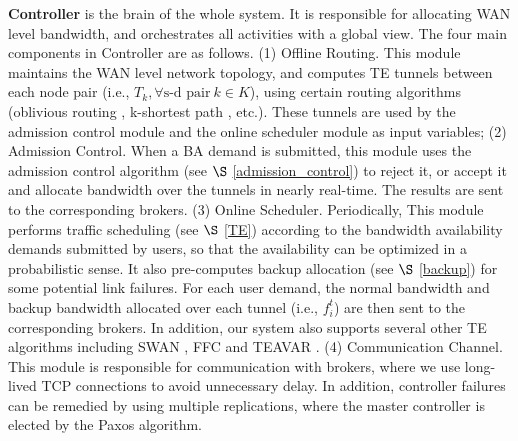 \documentclass[sigconf]{acmart}
\begin{document}



\textbf{Controller} is the brain of the whole system. It is responsible for allocating WAN level bandwidth, and orchestrates all activities with a global view. The four main components in Controller are as follows.
(1) Offline Routing.
This module maintains the WAN level network topology, and computes TE tunnels between each node pair
 (i.e., $T_k,\forall \text{s-d pair} \ k \in K$), using certain routing algorithms (oblivious routing \cite{SMORE}, k-shortest path \cite{swan}, etc.). 
These tunnels are used by the admission control module and the online scheduler module as input variables;
(2) Admission Control.
When a BA demand is submitted, this module uses the admission control algorithm (see $\S$ \ref{admission_control}) to reject it, or accept it and allocate bandwidth over the tunnels in nearly real-time.
The results are sent to the corresponding brokers.
(3) Online Scheduler. 
Periodically, This module performs traffic scheduling (see $\S$ \ref{TE}) according to the bandwidth availability demands submitted by users, so that the availability can be optimized in a probabilistic sense. 
It also pre-computes backup allocation (see $\S$ \ref{backup}) for some potential link failures.
For each user demand, the normal bandwidth and backup bandwidth allocated over each tunnel (i.e., $f_i^t$) are then sent to the corresponding brokers. 
In addition, our system also supports several other TE algorithms including SWAN \cite{swan}, FFC \cite{FFC} and TEAVAR \cite{Teavar}.
(4) Communication Channel.
This module is responsible for communication with brokers, where we use long-lived TCP connections to avoid unnecessary delay. 
In addition, controller failures can be remedied by using multiple replications, 
where the master controller is elected by the Paxos \cite{lamport1998the} algorithm.
\end{document}
